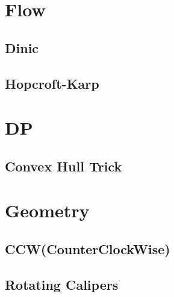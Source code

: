 \documentclass[10pt, a4paper]{article}
\begin{document}
\section{Flow}

\subsection{Dinic}


\subsection{Hopcroft-Karp}


% 



\section{DP}

\subsection{Convex Hull Trick}


% 



\section{Geometry}

\subsection{CCW(CounterClockWise)}


\subsection{Rotating Calipers}

\end{document}
